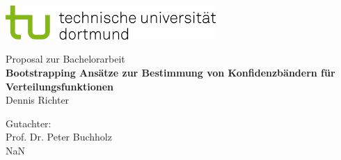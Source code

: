 \begin{titlepage}
\vspace*{-2cm}
\newlength{\links}
\setlength{\links}{-1.5cm}
\sffamily
\hspace*{\links}
\begin{minipage}{12.5cm}
\includegraphics[width=8cm]{bilder/tud_logo_rgb}
\end{minipage}

\vspace*{4cm}

\hspace*{\links}
\hspace*{-0.2cm}
\begin{minipage}{9cm}
\large
\begin{center}
{\Large Proposal zur Bachelorarbeit} \\
\vspace*{1cm}
\textbf{Bootstrapping Ansätze zur Bestimmung von Konfidenzbändern für Verteilungsfunktionen} \\
\vspace*{1cm}
Dennis Richter\\
\end{center}
\end{minipage}
\normalsize
\vspace*{5.5cm}


\vspace*{2.1cm}

\hspace*{\links}
\begin{minipage}[b]{5cm}
\raggedright
Gutachter: \\
Prof. Dr. Peter Buchholz \\
NaN \\
\end{minipage}


\end{titlepage}
